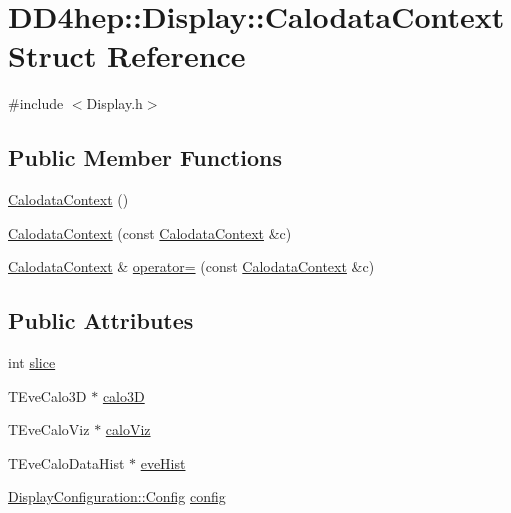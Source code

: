 \hypertarget{struct_d_d4hep_1_1_display_1_1_calodata_context}{}\section{D\+D4hep\+:\+:Display\+:\+:Calodata\+Context Struct Reference}
\label{struct_d_d4hep_1_1_display_1_1_calodata_context}


{\ttfamily \#include $<$Display.\+h$>$}

\subsection*{Public Member Functions}
\begin{DoxyCompactItemize}
\item 
\hyperlink{struct_d_d4hep_1_1_display_1_1_calodata_context_ac1928f77613385e401e1b850ace44faa}{Calodata\+Context} ()
\item 
\hyperlink{struct_d_d4hep_1_1_display_1_1_calodata_context_ae66034e60c417d10aac4c068337e85a3}{Calodata\+Context} (const \hyperlink{struct_d_d4hep_1_1_display_1_1_calodata_context}{Calodata\+Context} \&c)
\item 
\hyperlink{struct_d_d4hep_1_1_display_1_1_calodata_context}{Calodata\+Context} \& \hyperlink{struct_d_d4hep_1_1_display_1_1_calodata_context_a968ee17376ea7bbab48975b221184f5e}{operator=} (const \hyperlink{struct_d_d4hep_1_1_display_1_1_calodata_context}{Calodata\+Context} \&c)
\end{DoxyCompactItemize}
\subsection*{Public Attributes}
\begin{DoxyCompactItemize}
\item 
int \hyperlink{struct_d_d4hep_1_1_display_1_1_calodata_context_a7a289d192f903d7fd62f5db2b6631eea}{slice}
\item 
T\+Eve\+Calo3D $\ast$ \hyperlink{struct_d_d4hep_1_1_display_1_1_calodata_context_a61ac4175d05d258cc57210d2100c0663}{calo3D}
\item 
T\+Eve\+Calo\+Viz $\ast$ \hyperlink{struct_d_d4hep_1_1_display_1_1_calodata_context_af3730c667ed35846cfeb83eb21410cca}{calo\+Viz}
\item 
T\+Eve\+Calo\+Data\+Hist $\ast$ \hyperlink{struct_d_d4hep_1_1_display_1_1_calodata_context_a55f5826e26bf9f967abeb22cd1f507d7}{eve\+Hist}
\item 
\hyperlink{class_d_d4hep_1_1_display_configuration_1_1_config}{Display\+Configuration\+::\+Config} \hyperlink{struct_d_d4hep_1_1_display_1_1_calodata_context_ad05be864371ffba5b06eadcb9be8511b}{config}
\end{DoxyCompactItemize}


